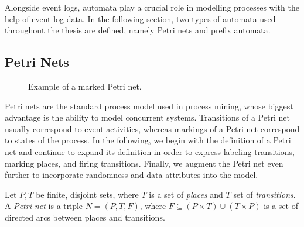 Alongside event logs, automata play a crucial role in modelling processes with the help of event log data. In the following section, two types of automata used throughout the thesis are defined, namely Petri nets and prefix automata.

\subsection{Petri Nets}

\begin{figure}[H]
    \centering
    \caption{Example of a marked Petri net.}
    \label{fig:petrinet}
\end{figure}

Petri nets are the standard process model used in process mining, whose biggest advantage is the ability to model concurrent systems. Transitions of a Petri net usually correspond to event activities, whereas markings of a Petri net correspond to states of the process. In the following, we begin with the definition of a Petri net and continue to expand its definition in order to express labeling transitions, marking places, and firing transitions. Finally, we augment the Petri net even further to incorporate randomness and data attributes into the model.

\begin{definition}
\label{def:petrinet}
    Let $P, T$ be finite, disjoint sets, where $T$ is a set of \emph{places} and $T$ set of \emph{transitions}. A \emph{Petri net} is a triple $N = (P, T, F)$, where $F \subseteq (P \times T) \cup (T \times P)$ is a set of directed arcs between places and transitions.
\end{definition}

